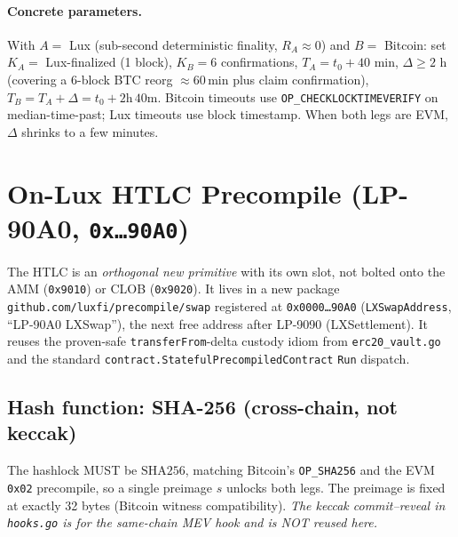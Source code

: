 \documentclass[11pt]{article}
\begin{document}
\paragraph{Concrete parameters.}
With $A=$ Lux (sub-second deterministic finality, $R_A\approx 0$) and $B=$
Bitcoin: set $K_A=$ Lux-finalized (1 block), $K_B=6$ confirmations,
$T_A = t_0 + 40\text{ min}$, $\Delta \ge 2\text{ h}$ (covering a 6-block BTC
reorg $\approx 60$\,min plus claim confirmation), $T_B = T_A + \Delta =
t_0 + 2\text{h}\,40\text{m}$. Bitcoin timeouts use \texttt{OP\_CHECKLOCKTIMEVERIFY}
on median-time-past; Lux timeouts use block timestamp. When both legs are EVM,
$\Delta$ shrinks to a few minutes.

\section{On-Lux HTLC Precompile (LP-90A0, \texttt{0x{\dots}90A0})}
\label{sec:precompile}

The HTLC is an \emph{orthogonal new primitive} with its own slot, not bolted
onto the AMM (\texttt{0x9010}) or CLOB (\texttt{0x9020}). It lives in a new
package \texttt{github.com/luxfi/precompile/swap} registered at
\texttt{0x0000{\dots}90A0} (\texttt{LXSwapAddress}, ``LP-90A0 LXSwap''), the next
free address after LP-9090 (LXSettlement). It reuses the proven-safe
\texttt{transferFrom}-delta custody idiom from \texttt{erc20\_vault.go} and the
standard \texttt{contract.StatefulPrecompiledContract} \texttt{Run} dispatch.

\subsection{Hash function: SHA-256 (cross-chain, not keccak)}
The hashlock MUST be $\mathrm{SHA256}$, matching Bitcoin's \texttt{OP\_SHA256}
and the EVM \texttt{0x02} precompile, so a single preimage $s$ unlocks both
legs. The preimage is fixed at exactly 32 bytes (Bitcoin witness compatibility).
\emph{The keccak commit--reveal in \texttt{hooks.go} is for the same-chain MEV
hook and is NOT reused here.}
\end{document}
